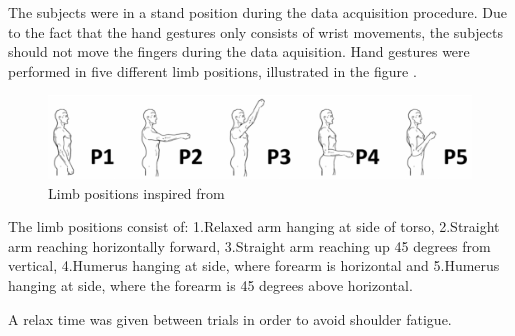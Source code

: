 The subjects were in a stand position during the data acquisition procedure. Due to the fact that the hand gestures only consists of wrist movements, the subjects should not move the fingers during the data aquisition. Hand gestures were performed in five different limb positions, illustrated in the figure .
\begin{figure}[H]                    
	\includegraphics[width=1\textwidth]{figures/protocol/limb_position}  %
	\caption{Limb positions inspired from \cite{Fougner2011}}
	\label{fig:limbpos}  %
\end{figure}

The limb positions consist of: 1.Relaxed arm hanging at side of torso, 2.Straight arm reaching horizontally forward, 3.Straight arm reaching up 45 degrees from vertical, 4.Humerus hanging at side, where forearm is horizontal and 5.Humerus hanging at side, where the forearm is 45 degrees above horizontal.

A relax time was given between trials in order to avoid shoulder fatigue.

